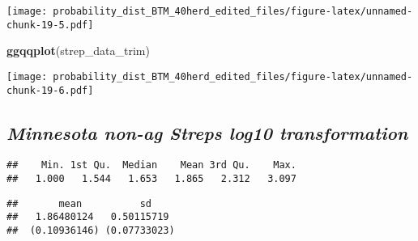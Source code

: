 \documentclass[]{article}
\newenvironment{Shaded}{\begin{snugshade}}{\end{snugshade}}
\newcommand{\KeywordTok}[1]{\textcolor[rgb]{0.13,0.29,0.53}{\textbf{#1}}}
\newcommand{\StringTok}[1]{\textcolor[rgb]{0.31,0.60,0.02}{#1}}
\newcommand{\CommentTok}[1]{\textcolor[rgb]{0.56,0.35,0.01}{\textit{#1}}}
\newcommand{\OperatorTok}[1]{\textcolor[rgb]{0.81,0.36,0.00}{\textbf{#1}}}
\newcommand{\NormalTok}[1]{#1}
\begin{document}
\texttt{[image: probability\_dist\_BTM\_40herd\_edited\_files/figure-latex/unnamed-chunk-19-5.pdf]}

\begin{Shaded}
\begin{Highlighting}[]
\KeywordTok{ggqqplot}\NormalTok{(strep_data_trim)}
\end{Highlighting}
\end{Shaded}

\texttt{[image: probability\_dist\_BTM\_40herd\_edited\_files/figure-latex/unnamed-chunk-19-6.pdf]}

\subsection{\texorpdfstring{\textbf{\emph{Minnesota non-ag Streps log10
transformation}}}{Minnesota non-ag Streps log10 transformation}}\label{minnesota-non-ag-streps-log10-transformation}

\begin{Shaded}
\end{Shaded}

\begin{verbatim}
##    Min. 1st Qu.  Median    Mean 3rd Qu.    Max. 
##   1.000   1.544   1.653   1.865   2.312   3.097
\end{verbatim}

\begin{Shaded}
\end{Shaded}

\begin{verbatim}
##       mean          sd    
##   1.86480124   0.50115719 
##  (0.10936146) (0.07733023)
\end{verbatim}
\end{document}
